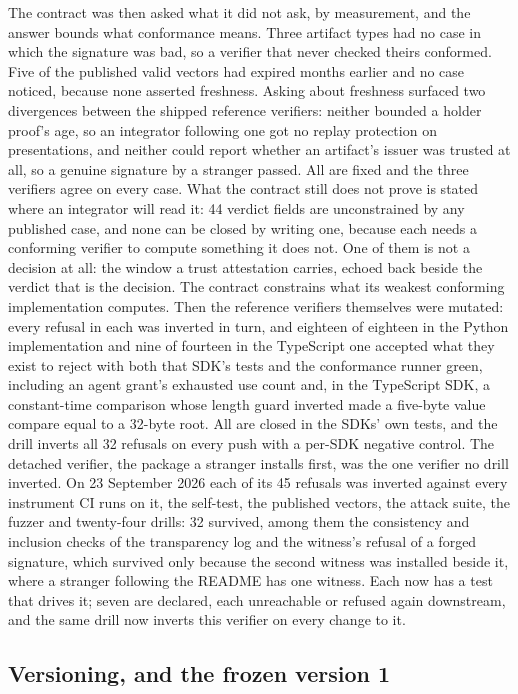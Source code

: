 The contract was then asked what it did not ask, by measurement, and the answer bounds what
conformance means. Three artifact types had no case in which the signature was bad, so a verifier
that never checked theirs conformed. Five of the published valid vectors had expired months earlier
and no case noticed, because none asserted freshness. Asking about freshness surfaced two divergences
between the shipped reference verifiers: neither bounded a holder proof's age, so an integrator
following one got no replay protection on presentations, and neither could report whether an
artifact's issuer was trusted at all, so a genuine signature by a stranger passed. All are fixed and
the three verifiers agree on every case. What the contract still does not prove is stated where an
integrator will read it: 44 verdict fields are unconstrained by any published case, and none can be
closed by writing one, because each needs a conforming verifier to compute something it does not.
One of them is not a decision at all: the window a trust attestation carries, echoed back beside the
 verdict that is the decision.
The contract constrains what its weakest conforming implementation computes. Then the reference
verifiers themselves were mutated: every refusal in each was inverted in turn, and eighteen of
eighteen in the Python implementation and nine of fourteen in the TypeScript one accepted what they
exist to reject with both that SDK's tests and the conformance runner green, including an agent
grant's exhausted use count and, in the TypeScript SDK, a constant-time comparison whose length guard
inverted made a five-byte value compare equal to a 32-byte root. All are closed in the SDKs' own
tests, and the drill inverts all 32 refusals on every push with a per-SDK negative control. The
detached verifier, the package a stranger installs first, was the one verifier no drill inverted.
On 23 September 2026 each of its 45 refusals was inverted against every instrument CI runs on it,
the self-test, the published vectors, the attack suite, the fuzzer and twenty-four drills: 32
survived, among them the consistency and inclusion checks of the transparency log and the
 witness's refusal of a forged signature, which survived only because the
second witness was installed beside it, where a stranger following the README has one witness.
Each now has a test that drives it; seven are declared, each unreachable or refused again
downstream, and the same drill now inverts this verifier on every change to it. \sImpl

\subsection{Versioning, and the frozen version 1}

